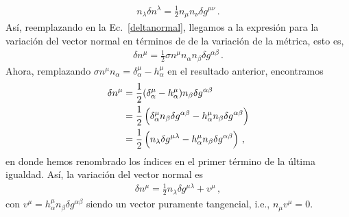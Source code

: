 \documentclass[../Main.tex]{subfiles}
\begin{document}
\begin{align}
    n_{\lambda}\delta n^{\lambda}=\frac{1}{2}n_{\mu}n_{\nu}\delta g^{\mu\nu}\, .
\end{align}
Así, reemplazando en la Ec.~\eqref{deltanormal}, llegamos a la expresión para la variación del vector normal en términos de de la variación de la métrica, esto es, 
\begin{align}
    \delta n^{\mu}=\frac{1}{2}\sigma n^{\mu}n_{\alpha}n_{\beta}\delta g^{\alpha\beta}\, .
\end{align}\label{varnorm}
Ahora, remplazando $\sigma n^{\mu}n_{\alpha}=\delta^{\mu}_{\alpha}-h^{\mu}_{\alpha}$ en el resultado anterior, encontramos
\begin{align}\notag
\delta n^{\mu}&=\frac{1}{2}(\delta^{\mu}_{\alpha}-h^{\mu}_{\alpha})n_{\beta}\delta g^{\alpha\beta}\\ \notag
&=\frac{1}{2}\left(\delta^{\mu}_{\alpha}n_{\beta}\delta g^{\alpha\beta}-h^{\mu}_{\alpha}n_{\beta}\delta g^{\alpha\beta}\right)\\
&=\frac{1}{2}\left(n_{\lambda}\delta g^{\mu\lambda}-h^{\mu}_{\alpha}n_{\beta}\delta g^{\alpha\beta}\right)\, ,
\end{align}
en donde hemos renombrado los índices en el primer término de la última igualdad. Así, la variación del vector normal es
\begin{align}
    \delta n^{\mu}=\frac{1}{2}n_{\lambda}\delta g^{\mu\lambda}+ v^{\mu} \, ,
\end{align}
con $v^{\mu}=h^{\mu}_{\alpha}n_{\beta}\delta g^{\alpha\beta}$ siendo un vector puramente tangencial, i.e., $n_{\mu}v^{\mu}=0$.
\end{document}
